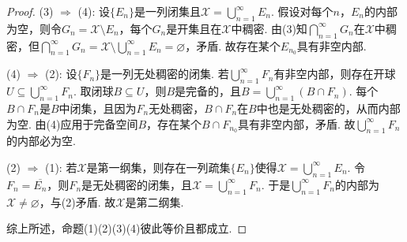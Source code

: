 \documentclass[../../main.tex]{subfiles}%
\begin{document}
\begin{proof}
{\heiti (3) $\Rightarrow$ (4):} 设$\{E_n\}$是一列闭集且$\mathscr{X}=\bigcup\limits_{n=1}^{\infty}E_n$. 假设对每个$n$，$E_n$的内部为空，则令$G_n=\mathscr{X}\setminus E_n$，每个$G_n$是开集且在$\mathscr{X}$中稠密. 由(3)知$\bigcap\limits_{n=1}^{\infty}G_n$在$\mathscr{X}$中稠密，但$\bigcap\limits_{n=1}^{\infty}G_n=\mathscr{X}\setminus\bigcup\limits_{n=1}^{\infty}E_n=\varnothing$，矛盾. 故存在某个$E_{n_0}$具有非空内部.

{\heiti (4) $\Rightarrow$ (2):} 设$\{F_n\}$是一列无处稠密的闭集. 若$\bigcup\limits_{n=1}^{\infty}F_n$有非空内部，则存在开球$U\subseteq\bigcup\limits_{n=1}^{\infty}F_n$. 取闭球$B\subseteq U$，则$B$是完备的，且$B=\bigcup\limits_{n=1}^{\infty}(B\cap F_n)$. 每个$B\cap F_n$是$B$中闭集，且因为$F_n$无处稠密，$B\cap F_n$在$B$中也是无处稠密的，从而内部为空. 由(4)应用于完备空间$B$，存在某个$B\cap F_{n_0}$具有非空内部，矛盾. 故$\bigcup\limits_{n=1}^{\infty}F_n$的内部必为空.

{\heiti (2) $\Rightarrow$ (1):} 若$\mathscr{X}$是第一纲集，则存在一列疏集$\{E_n\}$使得$\mathscr{X}=\bigcup\limits_{n=1}^{\infty}E_n$. 令$F_n=\overline{E_n}$，则$F_n$是无处稠密的闭集，且$\mathscr{X}=\bigcup\limits_{n=1}^{\infty}F_n$. 于是$\bigcup\limits_{n=1}^{\infty}F_n$的内部为$\mathscr{X}\neq\varnothing$，与(2)矛盾. 故$\mathscr{X}$是第二纲集.

综上所述，命题(1)(2)(3)(4)彼此等价且都成立.
\end{proof}
\end{document}
